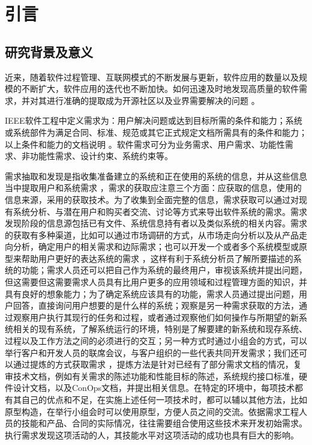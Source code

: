 \chapter{引言}\label{chap:introduction}

\section{研究背景及意义}

近来，随着软件过程管理、互联网模式的不断发展与更新，软件应用的数量以及规模的不断扩大，软件应用的迭代也不断加快。如何迅速及时地发现高质量的软件需求，并对其进行准确的提取成为开源社区以及业界需要解决的问题 \cite{Saur2006Review}。


IEEE软件工程中定义需求为：用户解决问题或达到目标所需的条件和能力；系统或系统部件为满足合同、标准、规范或其它正式规定文档所需具有的条件和能力；以上条件和能力的文档说明 \cite{Board2002IEEE}。软件需求可分为业务需求、用户需求、功能性需求、非功能性需求、设计约束、系统约束等。


需求抽取和发现是指收集准备建立的系统和正在使用的系统的信息，并从这些信息当中提取用户和系统需求 \cite{Vlas2011A}，需求的获取应注意三个方面：应获取的信息，使用的信息来源，采用的获取技术。为了收集到全面完整的信息，需求获取可以通过对现有系统分析、与潜在用户和购买者交流、讨论等方式来导出软件系统的需求。需求发现阶段的信息源包括已有文件、系统信息持有者以及类似系统的相关内容。需求的获取有多种渠道，比如可以通过市场调研的方式，从市场走向分析以及从产品走向分析，确定用户的相关需求和边际需求；也可以开发一个或者多个系统模型或原型来帮助用户更好的表达系统的需求 \cite{唐中君基于}，这样有利于系统分析员了解所要描述的系统的功能；需求人员还可以把自己作为系统的最终用户，审视该系统并提出问题，但这需要但这需要需求人员具有比用户更多的应用领域和过程管理方面的知识，并具有良好的想象能力；为了确定系统应该具有的功能，需求人员通过提出问题，用户回答，直接询问用户想要的是什么样的系统；观察是另一种需求获取的方法，通过观察用户执行其现行的任务和过程，或者通过观察他们如何操作与所期望的新系统相关的现有系统，了解系统运行的环境，特别是了解要建的新系统和现存系统、过程以及工作方法之间的必须进行的交互；另一种方式时通过小组会的方式，可以举行客户和开发人员的联席会议，与客户组织的一些代表共同开发需求；我们还可以通过提炼的方式获取需求 \cite{孙挺2002基于}，提炼方法是针对已经有了部分需求文档的情况，复审技术文档，例如有关需求的陈述功能和性能目标的陈述，系统规约接口标准，硬件设计文档，以及ConOps文档，并提出相关信息。在特定的环境中，每项技术都有其自己的优点和不足，在实施上述任何一项技术时，都可以辅以其他方法，比如原型构造，在举行小组会时可以使用原型，方便人员之间的交流。依据需求工程人员的技能和产品、合同的实际情况，往往需要组合使用这些技术来开发初始需求。执行需求发现这项活动的人，其技能水平对这项活动的成功也具有巨大的影响。

